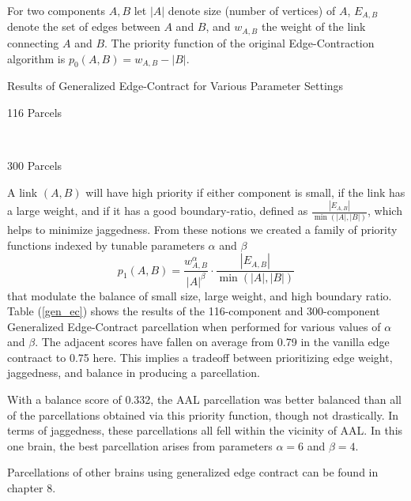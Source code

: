 For two components $A,B$ let $|A|$ denote size (number of vertices)
of $A$, $E_{A,B}$ denote the set of edges between $A$ and $B$, and
$w_{A,B}$ the weight of the link connecting $A$ and $B$.
The priority function of the original Edge-Contraction algorithm
is $p_0(A, B) = w_{A,B} - |B|$.

\begin{table}
\caption{Results of Generalized Edge-Contract for Various Parameter Settings}
\centering
\begin{subtable}[v]{0.5\textwidth}
  
  \caption{116 Parcels}
\end{subtable}
~
\begin{subtable}[v]{0.5\textwidth}
  
  \caption{300 Parcels}
\end{subtable}
\label{gen_ec}
\end{table}

A link $(A, B)$ will have high priority if either component is small,
if the link has a large weight, and if it has a good boundary-ratio,
defined as $\frac{|E_{A,B}|}{\min(|A|,|B|)}$, which helps to minimize
jaggedness. From these notions we created a family of priority
functions indexed by tunable parameters $\alpha$ and $\beta$
\begin{equation} \label{priority_func}
p_1(A, B) = \frac{w_{A,B}^\alpha}{|A|^\beta} \cdot
            \frac{|E_{A,B}|}{\min(|A|,|B|)}
\end{equation}
that modulate the balance of small size, large weight, and high
boundary ratio. Table (\ref{gen_ec}) shows the results of the
116-component and 300-component Generalized Edge-Contract parcellation
when performed for various values of $\alpha$ and $\beta$. The adjacent
scores have fallen on average from 0.79 in the vanilla edge contraact
to 0.75 here. This implies a tradeoff between prioritizing edge weight,
jaggedness, and balance in producing a parcellation.

With a balance score of 0.332, the AAL parcellation was better balanced
than all of the parcellations obtained via this priority function,
though not drastically. In terms of jaggedness, these parcellations
all fell within the vicinity of AAL. In this one brain, the best
parcellation arises from parameters $\alpha = 6$ and $\beta = 4$.

Parcellations of other brains using generalized edge contract can be
found in chapter 8.
